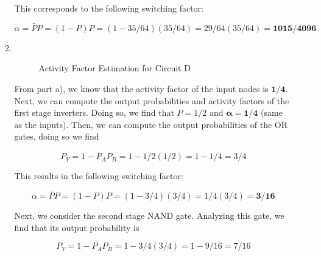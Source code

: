 \documentclass[fleqn]{article}
\begin{document}
\begin{enumerate}
\begin{enumerate}
			This corresponds to the following switching factor:
			
			\begin{equation*}
				\alpha = \bar{P}P = (1 - P)P = (1 - 35/64)(35/64) = 29/64(35/64) = \mathbf{1015/4096}
			\end{equation*}
			
			\item ~
			
			\begin{figure}[H]				
				\centerline{}
				\caption{Activity Factor Estimation for Circuit D}
				\label{fig::activity_factor_d}
			\end{figure}
			
			From part a), we know that the activity factor of the input nodes is $\mathbf{1/4}$. Next, we can compute the output probabilities and activity factors of the first stage inverters. Doing so, we find that $P = 1/2$ and $\mathbf{\alpha = 1/4}$ (same as the inputs). Then, we can compute the output probabilities of the OR gates, doing so we find

			\begin{equation*}
				P_Y = 1 - \bar{P}_A\bar{P}_B = 1 - 1/2(1/2) = 1 - 1/4 = 3/4
			\end{equation*}
			
			This results in the following switching factor:
			
			\begin{equation*}
				\alpha = \bar{P}P = (1 - P)P = (1 - 3/4)(3/4) = 1/4(3/4) = \mathbf{3/16}
			\end{equation*}
			
			Next, we consider the second stage NAND gate. Analyzing this gate, we find that its output probability is
			
			\begin{equation*}
				P_Y = 1 - P_AP_B = 1 - 3/4(3/4) = 1 - 9/16 = 7/16
			\end{equation*}
			

\end{enumerate}
\end{enumerate}
\end{document}
